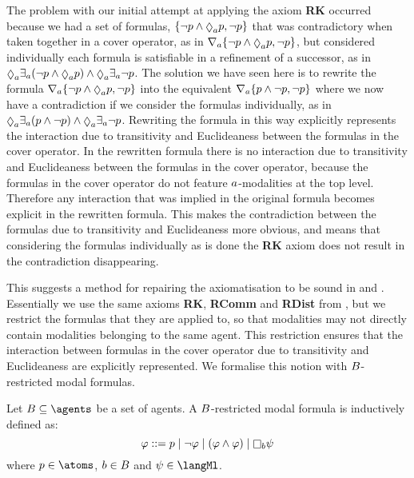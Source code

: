 \pagebreak

The problem with our initial attempt at applying the axiom {\bf RK} occurred because we had a set of formulas, $\{\lnot \atomP \land \possibleA \atomP, \lnot \atomP\}$ that was contradictory when taken together in a cover operator, as in $\coverA \{\lnot \atomP \land \possibleA \atomP, \lnot \atomP\}$, but considered individually each formula is satisfiable in a refinement of a successor, as in $\possibleA \somerefsA (\lnot \atomP \land \possibleA \atomP) \land \possibleA \somerefsA \lnot \atomP$.
The solution we have seen here is to rewrite the formula $\coversA \{\lnot \atomP \land \possibleA \atomP, \lnot \atomP\}$ into the equivalent $\nabla_{a} \{p \land \lnot p, \lnot p\}$ where we now have a contradiction if we consider the formulas individually, as in $\possibleA \somerefsA (\atomP \land \lnot \atomP) \land \possibleA \somerefsA \lnot \atomP$.
Rewriting the formula in this way explicitly represents the interaction due to transitivity and Euclideaness between the formulas in the cover operator.
In the rewritten formula there is no interaction due to transitivity and Euclideaness between the formulas in the cover operator, because the formulas in the cover operator do not feature $a$-modalities at the top level.
Therefore any interaction that was implied in the original formula becomes explicit in the rewritten formula.
This makes the contradiction between the formulas due to transitivity and Euclideaness more obvious, and means that considering the formulas individually as is done the {\bf RK} axiom does not result in the contradiction disappearing.

This suggests a method for repairing the axiomatisation \axiomRmlK{} to be sound in \logicRmlKFF{} and \logicRmlKD{}.
Essentially we use the same axioms {\bf RK}, {\bf RComm} and {\bf RDist} from \axiomRmlK{}, but we restrict the formulas that they are applied to, so that modalities may not directly contain modalities belonging to the same agent.
This restriction ensures that the interaction between formulas in the cover operator due to transitivity and Euclideaness are explicitly represented.
We formalise this notion with $B$-restricted modal formulas.

\begin{definition}\label{b-restricted}
Let $\agentsB \subseteq \agents$ be a set of agents.
A $B$-restricted modal formula is inductively defined as:
$$
\phi ::= \atomP \mid
         \lnot \phi \mid
         (\phi \land \phi) \mid
         \necessary[\agentB] \psi
$$
where $\atomP \in \atoms$, $b \in B$ and $\psi \in \langMl$.
\end{definition}

